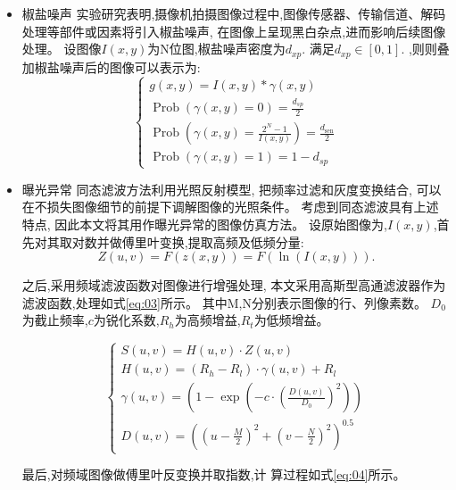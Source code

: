 \documentclass{amsart}
\begin{document}
\begin{itemize}
\item 椒盐噪声
  实验研究表明,摄像机拍摄图像过程中,图像传感器、传输信道、解码处理等部件或因素将引入椒盐噪声,
  在图像上呈现黑白杂点,进而影响后续图像处理。
  设图像$I(x,y)$为N位图,椒盐噪声密度为$d_{xp}$.
  满足$d_{xp}\in [0,1]$.
  ,则则叠加椒盐噪声后的图像可以表示为:
  \begin{equation}
    \label{eq:01}
  \left\{\begin{array}{l}
g(x, y)=I(x, y) * \gamma(x, y) \\
\operatorname{Prob}(\gamma(x, y)=0)=\frac{d_{s p}}{2} \\
\operatorname{Prob}\left(\gamma(x, y)=\frac{2^{N}-1}{I(x, y)}\right)=\frac{d_{\operatorname{sen}}}{2} \\
\operatorname{Prob}(\gamma(x, y)=1)=1-d_{s p}
\end{array}\right.
  \end{equation}

\item 曝光异常
  同态滤波方法利用光照反射模型,
  把频率过滤和灰度变换结合,
  可以在不损失图像细节的前提下调解图像的光照条件。
  考虑到同态滤波具有上述特点,
  因此本文将其用作曝光异常的图像仿真方法。
  设原始图像为,$I(x,y)$,首先对其取对数并做傅里叶变换,提取高频及低频分量:
  \begin{equation}
    \label{eq:02}
Z(u, v)=F(z(x, y))=F(\ln (I(x, y))).
  \end{equation}

  之后,采用频域滤波函数对图像进行增强处理,
  本文采用高斯型高通滤波器作为滤波函数,处理如式\ref{eq:03}所示。
  其中M,N分别表示图像的行、列像素数。
  $D_0$为截止频率,$c$为锐化系数,$R_h$为高频增益,$R_t$为低频增益。

  \begin{equation}
    \label{eq:03}
\left\{\begin{array}{l}
S(u, v)=H(u, v) \cdot Z(u, v) \\
H(u, v)=\left(R_{h}-R_{l}\right) \cdot \gamma(u, v)+R_{l} \\
\gamma(u, v)=\left(1-\exp \left(-c \cdot\left(\frac{D(u, v)}{D_{0}}\right)^{2}\right)\right) \\
D(u, v)=\left(\left(u-\frac{M}{2}\right)^{2}+\left(v-\frac{N}{2}\right)^{2}\right)^{0.5}
\end{array}\right.
  \end{equation}

  最后,对频域图像做傅里叶反变换并取指数,计
  算过程如式\ref{eq:04}所示。


\end{itemize}
\end{document}
